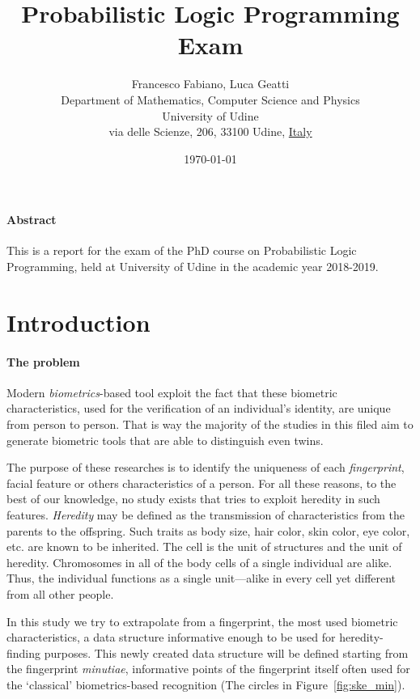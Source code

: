 \documentclass[8pt]{article}
\title{Probabilistic Logic Programming Exam}
\author{
        Francesco Fabiano, Luca Geatti\\
        \footnotesize Department of Mathematics, Computer Science and Physics \\
        \footnotesize University of Udine\\
        \footnotesize via delle Scienze, 206, 33100 Udine, \underline{Italy}
}
\date{\footnotesize\today}
\begin{document}
\maketitle
\paragraph{Abstract}
This is a report for the exam of the PhD course on Probabilistic Logic
Programming, held at University of Udine in the academic year 2018-2019.



\section{Introduction}

  \paragraph{The problem}
    Modern \textit{biometrics}-based tool exploit the fact that these biometric characteristics, used for the verification of an individual’s identity, are unique from person to person.
    That is way the majority of the studies in this filed aim to generate biometric tools that are able to distinguish even twins.
    
    The purpose of these researches is to identify the uniqueness of each \textit{fingerprint}, facial feature or others characteristics of a person.
    For all these reasons, to the best of our knowledge, no study exists that tries to exploit heredity in such features.
    \textit{Heredity} may be defined as the transmission of characteristics from the parents to the offspring.
    Such traits as body size, hair color, skin color, eye color, etc. are known to be inherited.
    The cell is the unit of structures and the unit of heredity.
    Chromosomes in all of the body cells of a single individual are alike.
    Thus, the individual functions as a single unit—alike in every cell yet different from all other people.
    
    In this study we try to extrapolate from a fingerprint, the most used biometric characteristics, a data structure informative enough to be used for heredity-finding purposes.
    This newly created data structure will be defined starting from the fingerprint \textit{minutiae}, informative points of the fingerprint itself often used for the \textquoteleft classical' biometrics-based recognition (The circles in Figure~\ref{fig:ske_min}).
\end{document}
